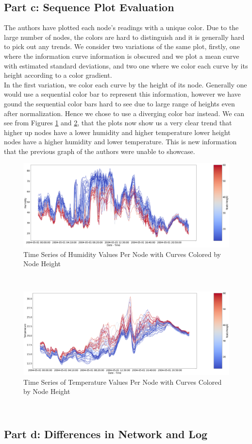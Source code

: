 \documentclass[11pt, letterpaper]{article}
\begin{document}
\subsection{Part c: Sequence Plot Evaluation}
The authors have plotted each node's readings with a unique color. Due to the large number of nodes, the colors are hard to distinguish and it is generally hard to pick out any trends. We consider two variations of the same plot, firstly, one where the information curve information is obscured and we plot a mean curve with estimated standard deviations, and two one where we color each curve by its height according to a color gradient.
\\
In the first variation, we color each curve by the height of its node. Generally one would use a sequential color bar to represent this information, however we have gound the sequential color bars hard to see due to large range of heights even after normalization. Hence we chose to use a diverging color bar instead. We can see from Figures \ref{fig:graph_crtique_c1} and \ref{fig:graph_crtique_c2}, that the plots now show us a very clear trend that higher up nodes have a lower humidity and higher temperature lower height nodes have a higher humidity and lower temperature.  This is new information that the previous graph of the authors were unable to showcase.
\begin{figure}[h!]
\centering
\includegraphics[width=1.0\textwidth]{Report Images/fig8_graph_critique_c1.png}
\caption{Time Series of Humidity Values Per Node with Curves Colored by Node Height}
\label{fig:graph_crtique_c1}
\end{figure}
\\
\begin{figure}[h!]
\centering
\includegraphics[width=1.0\textwidth]{Report Images/fig8_graph_critique_c2.png}
\caption{Time Series of Temperature Values Per Node with Curves Colored by Node Height}
\label{fig:graph_crtique_c2}
\end{figure}
\\


\subsection{Part d: Differences in Network and Log}
\end{document}
